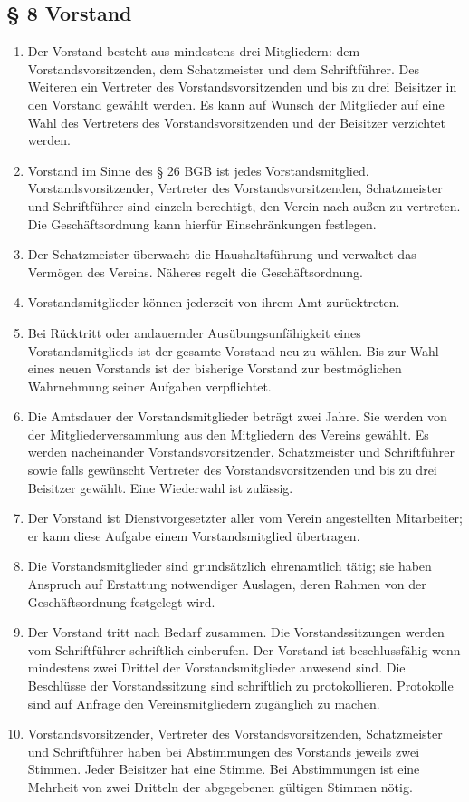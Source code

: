 \documentclass[10pt,a4paper]{scrartcl}
\begin{document}
\subsection*{§ 8 Vorstand }
\begin{enumerate}
    \item Der Vorstand besteht aus mindestens drei Mitgliedern: dem
    Vorstandsvorsitzenden, dem Schatzmeister und dem Schriftführer. Des
    Weiteren ein Vertreter des Vorstandsvorsitzenden und bis zu drei Beisitzer in den Vorstand gewählt werden. Es
    kann auf Wunsch der Mitglieder auf eine Wahl des Vertreters des Vorstandsvorsitzenden und der Beisitzer verzichtet
    werden.
    \item Vorstand im Sinne des § 26 BGB ist jedes Vorstandsmitglied.
    Vorstandsvorsitzender, Vertreter des Vorstandsvorsitzenden, Schatzmeister und Schriftführer sind einzeln
    berechtigt, den Verein nach außen zu vertreten. Die Geschäftsordnung kann
    hierfür Einschränkungen festlegen.
	\item Der Schatzmeister über\-wacht die Haushaltsführung und verwaltet das
		Ver\-mö\-gen des Vereins. Nä\-her\-es regelt die Ge\-schäfts\-ord\-nung.
	\item Vorstandsmitglieder können jederzeit von ihrem Amt zurücktreten.
	\item Bei Rücktritt oder andauernder Ausübungsunfähigkeit eines Vorstandsmitglieds ist
		der gesamte Vorstand neu zu wählen. Bis zur Wahl eines neuen Vorstands ist der
		bisherige Vorstand zur bestmöglichen Wahrnehmung seiner Aufgaben verpflichtet.
    \item Die Amtsdauer der Vorstandsmitglieder beträgt zwei Jahre. Sie werden
    von der Mitgliederversammlung aus den Mitgliedern des Vereins gewählt. Es
    werden nacheinander Vorstandsvorsitzender, Schatzmeister und Schriftführer
    sowie falls gewünscht Vertreter des Vorstandsvorsitzenden und bis zu drei Beisitzer gewählt. Eine Wiederwahl ist
    zulässig.
	\item Der Vorstand ist Dienstvorgesetzter aller vom Verein angestellten Mitarbeiter;
		er kann diese Aufgabe einem Vorstandsmitglied übertragen.
	\item Die Vorstandsmitglieder sind grundsätzlich ehrenamtlich tätig; sie haben Anspruch
		auf Erstattung notwendiger Auslagen, deren Rahmen von der Geschäftsordnung
		festgelegt wird.
    \item Der Vorstand tritt nach Bedarf zusammen. Die Vorstandssitzungen
    werden vom Schriftführer schriftlich einberufen. Der Vorstand ist
    beschlussfähig wenn mindestens zwei Drittel der Vorstandsmitglieder
    anwesend sind. Die Beschlüsse der Vorstandssitzung sind schriftlich zu
    protokollieren. Protokolle sind auf Anfrage den Vereinsmitgliedern zugänglich zu machen.
    \item Vorstandsvorsitzender, Vertreter des Vorstandsvorsitzenden, Schatzmeister und Schriftführer haben bei
    Abstimmungen des Vorstands jeweils zwei Stimmen. Jeder Beisitzer hat eine
    Stimme. Bei Abstimmungen ist eine Mehrheit von zwei Dritteln der
    abgegebenen gültigen Stimmen nötig.
\end{enumerate}
\end{document}

